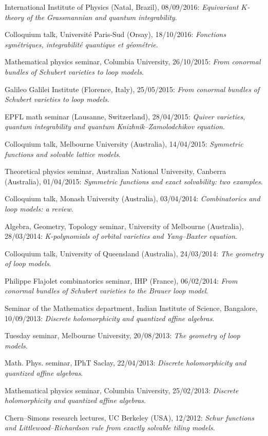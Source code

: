 \s International Institute of Physics (Natal, Brazil), 08/09/2016: {\sl Equivariant $K$-theory of the Grassmannian and quantum integrability}.

\s Colloquium talk, Universit\'e Paris-Sud (Orsay), 18/10/2016: {\sl Fonctions sym\'etriques, integrabilit\'e quantique et g\'eom\'etrie}.

\s Mathematical physics seminar, Columbia University, 26/10/2015: {\sl From conormal bundles of Schubert varieties to loop models}.

\s Galileo Galilei Institute (Florence, Italy), 25/05/2015: {\sl From conormal bundles of Schubert varieties to loop models}.

\s EPFL math seminar (Lausanne, Switzerland), 28/04/2015: {\sl Quiver varieties, quantum integrability and quantum Knizhnik--Zamolodchikov equation}.

\s Colloquium talk, Melbourne University (Australia), 14/04/2015: {\sl Symmetric functions and solvable lattice models}. 

\s Theoretical physics seminar, Australian National University, Canberra (Australia), 01/04/2015: {\sl Symmetric functions and exact solvability: two examples}.

\s Colloquium talk, Monash University (Australia), 03/04/2014: {\sl Combinatorics and loop models: a review}.

\s Algebra, Geometry, Topology seminar, University of Melbourne (Australia), 28/03/2014: {\sl K-polynomials of orbital varieties and Yang--Baxter equation}.

\s Colloquium talk, University of Queensland (Australia), 24/03/2014: {\sl The geometry of loop models}.

\s Philippe Flajolet combinatorics seminar, IHP (France), 06/02/2014: {\sl From conormal bundles of Schubert varieties to the Brauer loop model}.

\s Seminar of the Mathematics department, Indian Institute of Science, Bangalore, 10/09/2013: {\sl Discrete holomorphicity and quantized affine algebras}. 

\s Tuesday seminar, Melbourne University, 20/08/2013: {\sl The geometry of loop models}. 

\s Math. Phys. seminar, IPhT Saclay, 22/04/2013: {\sl Discrete holomorphicity and quantized affine algebras}. 

\s Mathematical physics seminar, Columbia University, 25/02/2013: {\sl Discrete holomorphicity and quantized affine algebras}. 

\s Chern--Simons research lectures, UC Berkeley (USA), 12/2012: {\sl Schur functions and Littlewood--Richardson rule from exactly solvable tiling models}.

